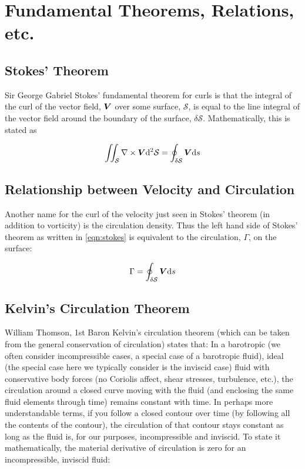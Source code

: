 \section{Fundamental Theorems, Relations, etc.}
\label{ch:background_sec:theorems}

\subsection{Stokes' Theorem}

Sir George Gabriel Stokes' fundamental theorem for curls is that the integral of the curl of the vector field, \(\bm{V}\) over some surface, \(\mathcal{S}\), is equal to the line integral of the vector field around the boundary of the surface, \(\delta\mathcal{S}\).
Mathematically, this  is stated as

\begin{equation}
    \label{eqn:stokes}
	\iint_\mathcal{S} \nabla \times \bm{V} \mathrm{d}^2 \mathcal{S} = \oint_{\delta\mathcal{S}} \bm{V} \mathrm{d} s
\end{equation}





\subsection{Relationship between Velocity and Circulation}

Another name for the curl of the velocity just seen in Stokes' theorem (in addition to vorticity) is the circulation density.
%
Thus the left hand side of Stokes' theorem as written in \cref{eqn:stokes} is equivalent to the circulation, \(\Gamma\), on the surface:

\begin{equation}
    \label{eqn:stokescirc}
	\Gamma = \oint_{\delta\mathcal{S}} \bm{V} \mathrm{d} s
\end{equation}





\subsection{Kelvin's Circulation Theorem}

William Thomson, 1st Baron Kelvin's circulation theorem (which can be taken from the general conservation of circulation) states that:
In a barotropic (we often consider incompressible cases, a special case of a barotropic fluid), ideal (the special case here we typically consider is the inviscid case) fluid with conservative body forces (no Coriolis affect, shear stresses, turbulence, etc.), the circulation around a closed curve moving with the fluid (and enclosing the same fluid elements through time) remains constant with time.
%
In perhaps more understandable terms, if you follow a closed contour over time (by following all the contents of the contour), the circulation of that contour stays constant as long as the fluid is, for our purposes, incompressible and inviscid.
%
To state it mathematically, the material derivative of circulation is zero for an incompressible, inviscid fluid:

